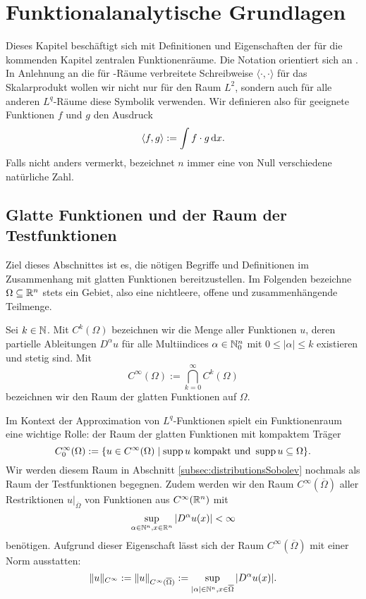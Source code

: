 \chapter{Funktionalanalytische Grundlagen}
\label{cp:grundlagen}

Dieses Kapitel beschäftigt sich mit Definitionen und Eigenschaften der für die kommenden Kapitel zentralen Funktionenräume.
Die Notation orientiert sich an \cite{sohr2001navier}.
In Anlehnung an die für \hilbert\hyp{}Räume verbreitete Schreibweise $\langle \cdot, \cdot \rangle$ für das Skalarprodukt wollen wir nicht nur für den Raum $L^2$, sondern auch für alle anderen $L^q$\hyp{}Räume diese Symbolik verwenden.
Wir definieren also für geeignete Funktionen $f$ und $g$ den Ausdruck
$$
\langle f, g \rangle := \int f \cdot g \, {\operatorname{d}\!{x}}.
$$
Falls nicht anders vermerkt, bezeichnet $n$ immer eine von Null verschiedene natürliche Zahl.

\section{Glatte Funktionen und der Raum der Testfunktionen}
\label{subsec:smooth}

Ziel dieses Abschnittes ist es, die nötigen Begriffe und Definitionen im Zusammenhang mit glatten Funktionen bereitzustellen.
Im Folgenden bezeichne $\Omega \subseteq \mathbb{R}^n$ stets ein Gebiet, also eine nichtleere, offene und zusammenhängende Teilmenge.

Sei $k \in \mathbb{N}$. Mit $C^k(\Omega)$ bezeichnen wir die Menge aller Funktionen $u$, deren partielle Ableitungen $D^\alpha u$ für alle Multiindices $\alpha \in \mathbb{N}_0^n$ mit $0 \leq |\alpha| \leq k$ existieren und stetig sind. 
Mit
$$
  C^\infty(\Omega) := \bigcap_{k = 0}^\infty C^k(\Omega)
$$
bezeichnen wir den Raum der glatten Funktionen auf $\Omega$.

Im Kontext der Approximation von $L^q$-Funktionen spielt ein Funktionenraum eine wichtige Rolle: der Raum der glatten Funktionen mit kompaktem Träger
$$
C_0^\infty(\Omega) := \{ u \in C^\infty(\Omega) \mid \operatorname{supp} u \text{ kompakt und } \operatorname{supp} u \subseteq \Omega\}.
$$
Wir werden diesem Raum in Abschnitt \ref{subsec:distributionsSobolev} nochmals als Raum der Testfunktionen begegnen.
Zudem werden wir den Raum $C^\infty(\overline\Omega)$ aller Restriktionen $u|_{\overline\Omega}$ von Funktionen aus $C^\infty(\mathbb{R}^n)$ mit
\begin{displaymath}
  \sup_{\alpha  \in \mathbb{N}^n, x \in \mathbb{R}^n} |D^\alpha u(x)| < \infty 
\end{displaymath}
benötigen.
Aufgrund dieser Eigenschaft lässt sich der Raum $C^\infty(\overline\Omega)$ mit einer Norm ausstatten:
\begin{equation}
  \label{eq:cInftyNorm}
  \lVert u \rVert_{C^\infty} := \lVert u \rVert_{C^\infty(\overline\Omega)} := \sup_{|\alpha| \in \mathbb{N}^n, x \in \overline\Omega} |D^\alpha u(x)|.
\end{equation}

